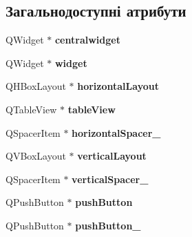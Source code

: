 \subsection*{Загальнодоступні атрибути}
\begin{DoxyCompactItemize}
\item 
\hypertarget{classUi__GoodsMgmtScreen_abfa4be510f02697ab627dc72c47c1888}{Q\-Widget $\ast$ {\bfseries centralwidget}}\label{classUi__GoodsMgmtScreen_abfa4be510f02697ab627dc72c47c1888}

\item 
\hypertarget{classUi__GoodsMgmtScreen_a333c4892b005fb5c4bca38319673e53e}{Q\-Widget $\ast$ {\bfseries widget}}\label{classUi__GoodsMgmtScreen_a333c4892b005fb5c4bca38319673e53e}

\item 
\hypertarget{classUi__GoodsMgmtScreen_a12559d85931a91843bd6fd09cd4d64e4}{Q\-H\-Box\-Layout $\ast$ {\bfseries horizontal\-Layout}}\label{classUi__GoodsMgmtScreen_a12559d85931a91843bd6fd09cd4d64e4}

\item 
\hypertarget{classUi__GoodsMgmtScreen_a078e673fc84f8b961db493bb6b26dda8}{Q\-Table\-View $\ast$ {\bfseries table\-View}}\label{classUi__GoodsMgmtScreen_a078e673fc84f8b961db493bb6b26dda8}

\item 
\hypertarget{classUi__GoodsMgmtScreen_ae2ae8b2addba0777a5873ced5ba138c6}{Q\-Spacer\-Item $\ast$ {\bfseries horizontal\-Spacer\-\_}}\label{classUi__GoodsMgmtScreen_ae2ae8b2addba0777a5873ced5ba138c6}

\item 
\hypertarget{classUi__GoodsMgmtScreen_a23241d1cc660d149303e5c83229f8922}{Q\-V\-Box\-Layout $\ast$ {\bfseries vertical\-Layout}}\label{classUi__GoodsMgmtScreen_a23241d1cc660d149303e5c83229f8922}

\item 
\hypertarget{classUi__GoodsMgmtScreen_a79389e92ca389d18fc25bf784f7a18c3}{Q\-Spacer\-Item $\ast$ {\bfseries vertical\-Spacer\-\_}}\label{classUi__GoodsMgmtScreen_a79389e92ca389d18fc25bf784f7a18c3}

\item 
\hypertarget{classUi__GoodsMgmtScreen_ab97cd64155f08fd94c224c96719ce07e}{Q\-Push\-Button $\ast$ {\bfseries push\-Button}}\label{classUi__GoodsMgmtScreen_ab97cd64155f08fd94c224c96719ce07e}

\item 
\hypertarget{classUi__GoodsMgmtScreen_a86e3a986aa53a06eaa1a37e8c5465f26}{Q\-Push\-Button $\ast$ {\bfseries push\-Button\-\_}}\label{classUi__GoodsMgmtScreen_a86e3a986aa53a06eaa1a37e8c5465f26}


\end{DoxyCompactItemize}
